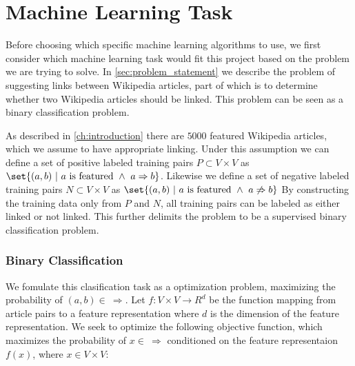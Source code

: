 

\section{Machine Learning Task}\label{sec:machine_learning_task}
Before choosing which specific machine learning algorithms to use, we first consider which machine learning task would fit this project based on the problem we are trying to solve. In \cref{sec:problem_statement} we describe the problem of suggesting links between Wikipedia articles, part of which is to determine whether two Wikipedia articles should be linked. This problem can be seen as a binary classification problem.

As described in \cref{ch:introduction} there are $5000$ featured Wikipedia articles, which we assume to have appropriate linking. Under this assumption we can define a set of positive labeled training pairs $P \subset V \times V$ as $\set{(a,b)\ |\ a\text{ is featured}\ \wedge\ a \Rightarrow b}$. Likewise we define a set of negative labeled training pairs $N \subset V \times V$ as $\set{(a,b)\ |\ a\text{ is featured}\ \wedge\ a \not\Rightarrow b}$
By constructing the training data only from $P$ and $N$, all training pairs can be labeled as either linked or not linked.  This further delimits the problem to be a supervised binary classification problem.
 
\subsubsection{Binary Classification}

We fomulate this clasification task as a optimization problem, maximizing the probability of $(a,b) \in \ \Rightarrow$. Let $f: V\times V \to R^d$ be the function mapping from article pairs to a feature representation where $d$ is the dimension of the feature representation.
We seek to optimize the following objective function, which maximizes the probability of $x \in \ \Rightarrow$ conditioned on the feature representaion $f(x)$, where $x \in V \times V$:

